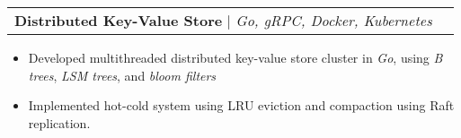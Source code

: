\documentclass[letterpaper,11pt]{article}
\makeatletter
\newcommand{\resumeItem}[1]{
  \item\small{
    {#1 \vspace{-2pt}}
  }
}
\newcommand{\resumeProjectHeading}[2]{
    \item
    \begin{tabular*}{0.97\textwidth}{l@{\extracolsep{\fill}}r}
      \small#1 & #2 \\
    \end{tabular*}\vspace{-7pt}
}
\newcommand{\resumeItemListStart}{\begin{itemize}}
\newcommand{\resumeItemListEnd}{\end{itemize}\vspace{-5pt}}
\makeatother
\begin{document}
  

        \resumeProjectHeading
          {\textbf{Distributed Key-Value Store} $|$ \emph{Go, gRPC, Docker, Kubernetes}}{}
          \resumeItemListStart
            \resumeItem{Developed multithreaded distributed key-value store cluster in \textit{Go}, using \textit{B trees}, \textit{LSM trees}, and \textit{bloom filters}}
            \resumeItem{Implemented hot-cold system using LRU eviction and compaction using Raft replication. }
          \resumeItemListEnd

        



\end{document}
